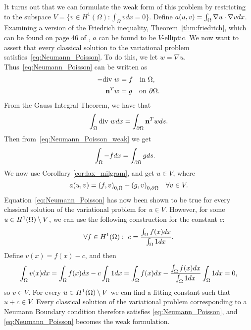 It turns out that we can formulate the weak form of this problem by restricting to the subspace $V=\{v\in H^1(\Omega):\int_{\Omega}vdx=0\}.$
Define $a(u,v) = \int_\Omega \nabla u \cdot \nabla v dx$. Examining a version of 
the Friedrich inequality, Theorem~\ref{thm:friedrich}, which can be found on 
page 46 of \cite{Braess}, $a$ can be found to be $V$-elliptic.
We now want to assert that every classical solution to the variational problem satisfies~\eqref{eq:Neumann_Poisson}.
To do this, we let $w=\nabla u$. Thus~\eqref{eq:Neumann_Poisson} can be written as
\begin{align}\label{eq:Neumann_Poisson_weak}
\begin{split}
    -\text{div } w &= f \quad \text{in } \Omega, \\
    \mathbf{n}^T w &= g \quad \text{on } \partial \Omega.
\end{split}    
\end{align}
From the Gauss Integral Theorem, we have that
\[\int_{\Omega} \text{div } w dx = \int_{\partial \Omega} \mathbf{n}^T w ds.\]
Then from~\eqref{eq:Neumann_Poisson_weak} we get
\begin{align}
\begin{split}
\int_{\Omega} -f dx &= \int_{\partial \Omega} g ds.
\end{split}
\end{align}
We now use Corollary \ref{cor:lax_milgram}, and get $u\in V$, where
\begin{equation}\label{eq:Lax-Milgram_Neumann}
  a(u,v) = {(f,v)}_{0,\Omega} + {(g,v)}_{0,\partial \Omega} \quad \forall v\in V.  
\end{equation}
Equation~\eqref{eq:Neumann_Poisson} has now been shown to be true for 
every classical solution of the variational problem for $u\in V$. However, for some 
$u\in H^1(\Omega)\setminus V$, we can use the following construction for 
the constant $c$:
\begin{equation*}
    \forall f \in H^1(\Omega): \,\, c = \frac{\int_\Omega f(x) dx }{\int_\Omega 1 dx}.
\end{equation*}
Define $v(x) = f(x) - c$, and then 
\begin{equation*}
    \int_\Omega v(x)dx = \int_\Omega f(x) dx - c\int_\Omega 1 dx = \int_\Omega f(x) dx - \frac{\int_\Omega f(x) dx }{\int_\Omega 1 dx} \int_\Omega 1 dx = 0,
\end{equation*}
so $v \in V$. For every $u\in H^1(\Omega)\setminus V$ we can find a fitting 
constant such that $u+c \in V$. Every classical solution of the 
variational problem corresponding to a Neumann Boundary condition therefore 
satisfies \eqref{eq:Neumann_Poisson}, and \eqref{eq:Neumann_Poisson} becomes the weak formulation.